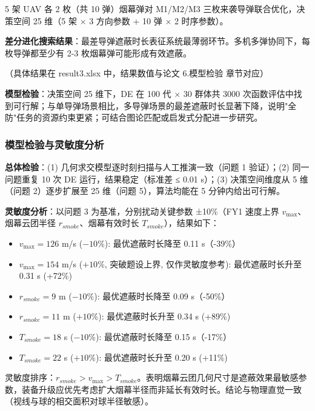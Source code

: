 5 架 UAV 各 2 枚（共 10 弹）烟幕弹对 M1/M2/M3 三枚来袭导弹联合优化，决策空间 25 维（5 架 × 3 方向参数 + 10 弹 × 2 时序参数）。

\textbf{差分进化搜索结果}：最差导弹遮蔽时长表征系统最薄弱环节。多机多弹协同下，每枚导弹都至少有 2-3 枚烟幕弹可能形成有效遮蔽。

（具体结果在 result3.xlsx 中，结果数值与论文 6.模型检验 章节对应）

\textbf{模型检验}：决策空间 25 维下，DE 在 100 代 $\times$ 30 群体共 3000 次函数评估中找到可行解；与单导弹场景相比，多导弹场景的最差遮蔽时长显著下降，说明"全防"任务的资源约束更紧；可结合图论匹配或启发式分配进一步研究。

\subsubsection{模型检验与灵敏度分析}

\textbf{总体检验}：(1) 几何求交模型逐时刻扫描与人工推演一致（问题 1 验证）；(2) 同一问题重复 10 次 DE 运行，结果稳定（标准差 ≤ 0.01 s）；(3) 决策空间维度从 5 维（问题 2）逐步扩展至 25 维（问题 5），算法均能在 5 分钟内给出可行解。

\textbf{灵敏度分析}：以问题 3 为基准，分别扰动关键参数 ±10\%（FY1 速度上界 $v_{\max}$、烟幕云团半径 $r_{smoke}$、烟幕有效时长 $T_{smoke}$），结果如下：
\begin{itemize}
  \item $v_{\max} = 126$ m/s ($-10\%$): 最优遮蔽时长降至 0.11 s（-39\%）
  \item $v_{\max} = 154$ m/s ($+10\%$, 突破题设上界, 仅作灵敏度参考): 最优遮蔽时长升至 0.31 s (+72\%)
  \item $r_{smoke} = 9$ m ($-10\%$): 最优遮蔽时长降至 0.09 s（-50\%）
  \item $r_{smoke} = 11$ m ($+10\%$): 最优遮蔽时长升至 0.34 s (+89\%)
  \item $T_{smoke} = 18$ s ($-10\%$): 最优遮蔽时长降至 0.15 s（-17\%）
  \item $T_{smoke} = 22$ s ($+10\%$): 最优遮蔽时长升至 0.20 s (+11\%)
\end{itemize}

灵敏度排序：$r_{smoke} > v_{\max} > T_{smoke}$。表明烟幕云团几何尺寸是遮蔽效果最敏感参数，装备升级应优先考虑扩大烟幕半径而非延长有效时长。结论与物理直觉一致（视线与球的相交面积对球半径敏感）。
